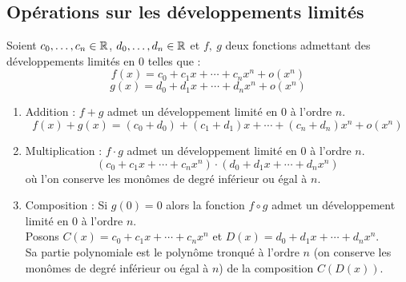 \subsection{Opérations sur les développements limités}
\begin{proposition}
    Soient $c_0, \ldots, c_n \in \mathbb{R}$, $d_0, \ldots, d_n \in \mathbb{R}$ et $f,\ g$ deux fonctions admettant des développements limités en 0 telles que :
    \[ f(x) = c_0 + c_1x + \cdots + c_n x^n + o(x^n) \]
    \[ g(x) = d_0 + d_1x + \cdots + d_n x^n + o(x^n) \]
    \begin{enumerate}
        \item Addition : $f + g$ admet un développement limité en 0 à l'ordre $n$.
        \[ f(x) + g(x) = (c_0 + d_0) + (c_1 + d_1)x + \cdots + (c_n + d_n) x^n + o(x^n) \]
        \item Multiplication : $f \cdot g$ admet un développement limité en 0 à l'ordre $n$.
        \[ (c_0 + c_1 x + \cdots + c_n x^n) \cdot (d_0 + d_1 x + \cdots + d_n x^n) \]
        où l'on conserve les monômes de degré inférieur ou égal à $n$.
        \item Composition : Si $g(0) = 0$ alors la fonction $f \circ g$ admet un développement limité en 0 à l'ordre $n$.\\
        Posons $C(x) = c_0 + c_1x + \cdots + c_n x^n$ et $D(x) = d_0 + d_1x + \cdots + d_n x^n$.\\
        Sa partie polynomiale est le polynôme tronqué à l'ordre $n$ (on conserve les monômes de degré inférieur ou égal à $n$) de la composition $C(D(x))$. 
    \end{enumerate}
\end{proposition}
